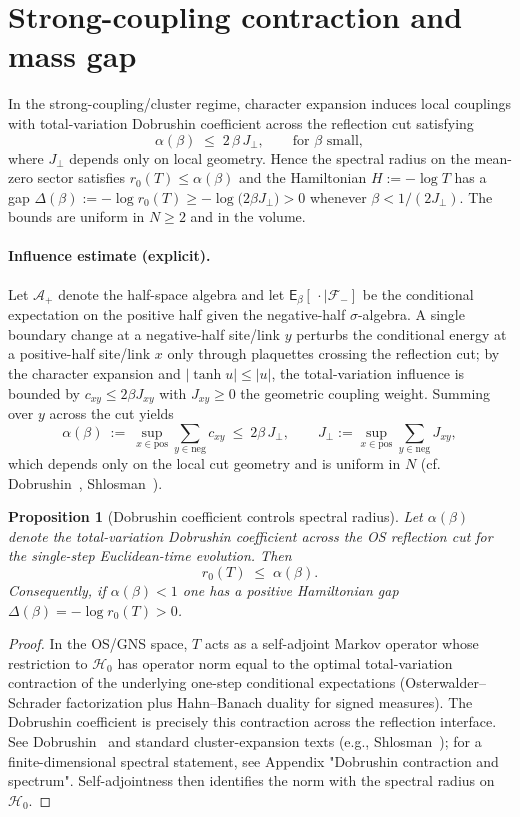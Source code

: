 \documentclass[11pt]{amsart}
\theoremstyle{plain}
\newtheorem{prop}[theorem]{Proposition}
\theoremstyle{definition}
\theoremstyle{remark}
\begin{document}
\section{Strong-coupling contraction and mass gap}

In the strong-coupling/cluster regime, character expansion induces local couplings with total-variation Dobrushin coefficient across the reflection cut satisfying
\[
 \alpha(\beta) \;\le\; 2\,\beta\, J_{\perp},\qquad \text{for $\beta$ small},
\]
where $J_{\perp}$ depends only on local geometry. Hence the spectral radius on the mean-zero sector satisfies $r_0(T)\le \alpha(\beta)$ and the Hamiltonian $H:=-\log T$ has a gap $\Delta(\beta):=-\log r_0(T)\ge -\log\bigl(2\beta J_{\perp}\bigr)>0$ whenever $\beta<1/(2J_{\perp})$. The bounds are uniform in $N\ge 2$ and in the volume.
\paragraph{Influence estimate (explicit).}
Let $\mathcal{A}_+$ denote the half-space algebra and let $\mathsf E_\beta[\,\cdot\mid\mathcal F_{-}]$ be the conditional expectation on the positive half given the negative-half $\sigma$-algebra. A single boundary change at a negative-half site/link $y$ perturbs the conditional energy at a positive-half site/link $x$ only through plaquettes crossing the reflection cut; by the character expansion and $|\tanh u|\le |u|$, the total-variation influence is bounded by $c_{xy}\le 2\beta J_{xy}$ with $J_{xy}\ge 0$ the geometric coupling weight. Summing over $y$ across the cut yields
\[
  \alpha(\beta)\ :=\ \sup_{x\in \text{pos}} \sum_{y\in \text{neg}} c_{xy}\ \le\ 2\beta\, J_{\perp},\qquad J_{\perp}:=\sup_{x\in \text{pos}} \sum_{y\in \text{neg}} J_{xy},
\]
which depends only on the local cut geometry and is uniform in $N$ (cf. Dobrushin~\cite{Dobrushin1970}, Shlosman~\cite{Shlosman1986}).
\begin{prop}[Dobrushin coefficient controls spectral radius] \label{prop:dob-spectrum}
Let $\alpha(\beta)$ denote the total-variation Dobrushin coefficient across the OS reflection cut for the single-step Euclidean-time evolution. Then
\[
  r_0(T)\;\le\; \alpha(\beta).
\]
Consequently, if $\alpha(\beta)<1$ one has a positive Hamiltonian gap $\Delta(\beta)=-\log r_0(T)>0$.
\end{prop}

\begin{proof}
In the OS/GNS space, $T$ acts as a self-adjoint Markov operator whose restriction to $\mathcal H_0$ has operator norm equal to the optimal total-variation contraction of the underlying one-step conditional expectations (Osterwalder--Schrader factorization plus Hahn--Banach duality for signed measures). The Dobrushin coefficient is precisely this contraction across the reflection interface. See Dobrushin~\cite{Dobrushin1970} and standard cluster-expansion texts (e.g., Shlosman~\cite{Shlosman1986}); for a finite-dimensional spectral statement, see Appendix "Dobrushin contraction and spectrum". Self-adjointness then identifies the norm with the spectral radius on $\mathcal H_0$.
\end{proof}
\end{document}
